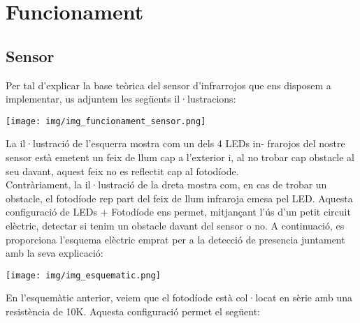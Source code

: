\documentclass[fleqn,10pt]{SelfArx} %
\affiliation{alloveras@salleurl.edu} %
\affiliation{Departament d'Enginyeria, La Salle Barcelona} %
\begin{document}
\flushbottom %

\maketitle %

\tableofcontents %

\thispagestyle{empty} %


\section{Funcionament}

\subsection{Sensor}
Per tal d’explicar la base teòrica del sensor d’infrarrojos
que ens disposem a implementar, us adjuntem les següents il·lustracions:\\

\begin{center}
\texttt{[image: img/img\_funcionament\_sensor.png]}
\end{center}


La il·lustració de l’esquerra mostra com un dels 4 LEDs in-
frarojos del nostre sensor està emetent un feix de llum cap a
l’exterior i, al no trobar cap obstacle al seu davant, aquest feix no es reflectit cap al fotodíode.\\

Contràriament, la il·lustració de la dreta mostra com, en cas
de trobar un obstacle, el fotodíode rep part del feix de llum
infraroja emesa pel LED.
Aquesta configuració de LEDs + Fotodíode ens permet, mitjançant
l’ús d’un petit circuit elèctric, detectar si tenim un obstacle
davant del sensor o no.
A continuació, es proporciona l’esquema elèctric emprat per
a la detecció de presencia juntament amb la seva explicació:
\begin{center}
\texttt{[image: img/img\_esquematic.png]}
\end{center}

En l’esquemàtic anterior, veiem que el fotodíode està col·locat
en sèrie amb una resistència de 10K. Aquesta configuració
permet el següent:
\end{document}
